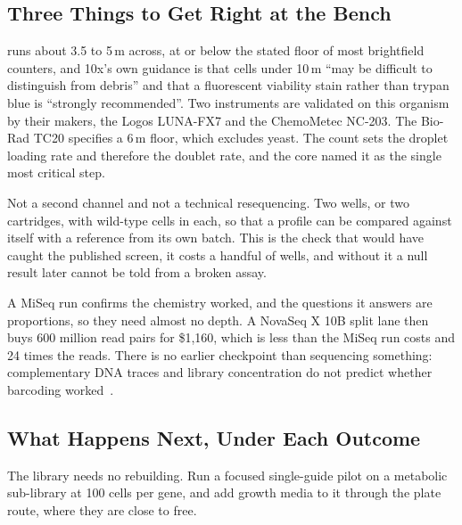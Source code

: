 \subsection{Three Things to Get Right at the Bench}
\label{sec:counting}

 runs about 3.5 to 5\,\textmu m
across, at or below the
stated floor of most brightfield counters, and 10x's own guidance is that cells
under 10\,\textmu m ``may be difficult to distinguish from debris'' and that a
fluorescent viability stain rather than trypan blue is ``strongly
recommended''. Two instruments are validated on this
organism by their makers, the Logos LUNA-FX7 and the ChemoMetec
NC-203. The Bio-Rad TC20
specifies a 6\,\textmu m floor, which excludes
yeast. The count sets the droplet loading rate and therefore the doublet rate,
and the core named it as the single most critical step.

 Not a second
channel and not a technical resequencing. Two wells, or two cartridges, with
wild-type cells in each, so that a profile can be compared against itself with a
reference from its own batch. This is the check that would have caught the
published screen, it costs a handful of wells, and without it a null result
later cannot be told from a broken assay.

 A MiSeq run confirms the chemistry
worked, and the questions it answers are proportions, so they need almost no
depth. A NovaSeq X 10B split lane then buys 600 million read pairs for \$1{,}160,
which is less than the MiSeq run costs and 24 times the reads. There is no
earlier checkpoint than sequencing something: complementary DNA traces and
library concentration do not predict whether barcoding
worked~\citep{brettnerUltraHighthroughputMassively2024}.

\subsection{What Happens Next, Under Each Outcome}
\label{sec:next}

 The library needs no rebuilding.
Run a focused single-guide pilot on a metabolic sub-library at 100 cells per
gene, and add growth media to it through the plate route, where they are close
to free.

